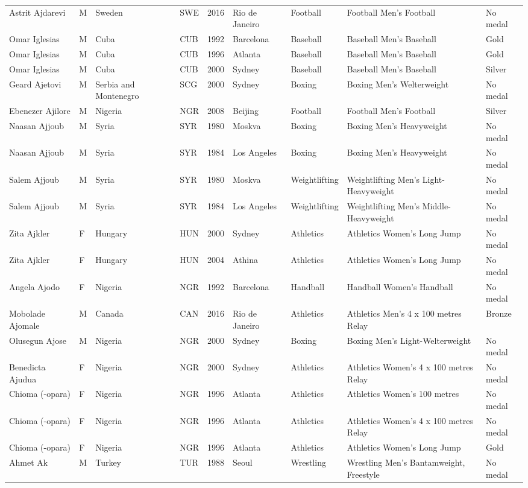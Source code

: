 \documentclass{article}%
\begin{document}
\begin{longtable}{l l l l l l l l l}
Astrit Ajdarevi&M&Sweden&SWE&2016&Rio de Janeiro&Football&Football Men's Football&No medal\\%
Omar Iglesias&M&Cuba&CUB&1992&Barcelona&Baseball&Baseball Men's Baseball&Gold\\%
Omar Iglesias&M&Cuba&CUB&1996&Atlanta&Baseball&Baseball Men's Baseball&Gold\\%
Omar Iglesias&M&Cuba&CUB&2000&Sydney&Baseball&Baseball Men's Baseball&Silver\\%
Geard Ajetovi&M&Serbia and Montenegro&SCG&2000&Sydney&Boxing&Boxing Men's Welterweight&No medal\\%
Ebenezer Ajilore&M&Nigeria&NGR&2008&Beijing&Football&Football Men's Football&Silver\\%
Naasan Ajjoub&M&Syria&SYR&1980&Moskva&Boxing&Boxing Men's Heavyweight&No medal\\%
Naasan Ajjoub&M&Syria&SYR&1984&Los Angeles&Boxing&Boxing Men's Heavyweight&No medal\\%
Salem Ajjoub&M&Syria&SYR&1980&Moskva&Weightlifting&Weightlifting Men's Light{-}Heavyweight&No medal\\%
Salem Ajjoub&M&Syria&SYR&1984&Los Angeles&Weightlifting&Weightlifting Men's Middle{-}Heavyweight&No medal\\%
Zita Ajkler&F&Hungary&HUN&2000&Sydney&Athletics&Athletics Women's Long Jump&No medal\\%
Zita Ajkler&F&Hungary&HUN&2004&Athina&Athletics&Athletics Women's Long Jump&No medal\\%
Angela Ajodo&F&Nigeria&NGR&1992&Barcelona&Handball&Handball Women's Handball&No medal\\%
Mobolade Ajomale&M&Canada&CAN&2016&Rio de Janeiro&Athletics&Athletics Men's 4 x 100 metres Relay&Bronze\\%
Olusegun Ajose&M&Nigeria&NGR&2000&Sydney&Boxing&Boxing Men's Light{-}Welterweight&No medal\\%
Benedicta Ajudua&F&Nigeria&NGR&2000&Sydney&Athletics&Athletics Women's 4 x 100 metres Relay&No medal\\%
Chioma ({-}opara)&F&Nigeria&NGR&1996&Atlanta&Athletics&Athletics Women's 100 metres&No medal\\%
Chioma ({-}opara)&F&Nigeria&NGR&1996&Atlanta&Athletics&Athletics Women's 4 x 100 metres Relay&No medal\\%
Chioma ({-}opara)&F&Nigeria&NGR&1996&Atlanta&Athletics&Athletics Women's Long Jump&Gold\\%
Ahmet Ak&M&Turkey&TUR&1988&Seoul&Wrestling&Wrestling Men's Bantamweight, Freestyle&No medal\\%

\end{longtable}
\end{document}
